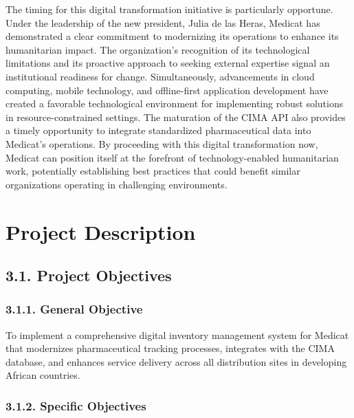 \documentclass[
]{report}
\begin{document}
The timing for this digital transformation initiative is particularly
opportune. Under the leadership of the new president, Julia de las
Heras, Medicat has demonstrated a clear commitment to modernizing its
operations to enhance its humanitarian impact. The organization's
recognition of its technological limitations and its proactive approach
to seeking external expertise signal an institutional readiness for
change. Simultaneously, advancements in cloud computing, mobile
technology, and offline-first application development have created a
favorable technological environment for implementing robust solutions in
resource-constrained settings. The maturation of the CIMA API also
provides a timely opportunity to integrate standardized pharmaceutical
data into Medicat's operations. By proceeding with this digital
transformation now, Medicat can position itself at the forefront of
technology-enabled humanitarian work, potentially establishing best
practices that could benefit similar organizations operating in
challenging environments.

\section{Project Description}\label{project-description}

\subsection{3.1. Project Objectives}\label{project-objectives}

\subsubsection{3.1.1. General Objective}\label{general-objective}

To implement a comprehensive digital inventory management system for
Medicat that modernizes pharmaceutical tracking processes, integrates
with the CIMA database, and enhances service delivery across all
distribution sites in developing African countries.

\subsubsection{3.1.2. Specific Objectives}\label{specific-objectives}
\end{document}
